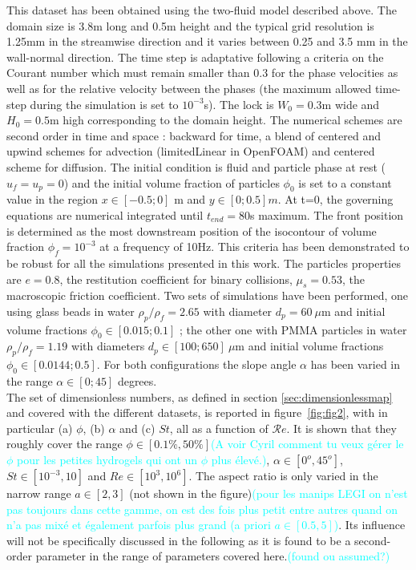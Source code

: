 \documentclass[twocolumn]{article}
\newcommand*{\marie}{\textcolor{Cyan}}
\begin{document}
This dataset has been obtained using the two-fluid model described above. The domain size is 3.8m long and 0.5m height and the typical grid resolution is 1.25mm in the streamwise direction and it varies between 0.25 and 3.5 mm in the wall-normal direction. The time step is adaptative following a criteria on the Courant number which must remain smaller than 0.3 for the phase velocities as well as for the relative velocity between the phases (the maximum allowed time-step during the simulation is set to $10^{-3}$s). The lock is $W_0=0.3$m wide and $H_0=0.5$m high corresponding to the domain height. The numerical schemes are second order in time and space : backward for time, a blend of centered and upwind schemes for advection (limitedLinear in OpenFOAM) and centered scheme for diffusion. The initial condition is fluid and particle phase at rest ($u_f=u_p=0$) and the initial volume fraction of particles $\phi_0$ is set to a constant value in the region $x\in[-0.5 ; 0]$ m and $y\in[0;0.5]m$. At t=0, the governing equations are numerical integrated until $t_{end}=80$s maximum. The front position is determined as the most downstream position of the isocontour of volume fraction $\phi_f=10^{-3}$ at a frequency of 10Hz. This criteria has been demonstrated to be robust for all the simulations presented in this work. The particles properties are $e=0.8$, the restitution coefficient for binary collisions, $\mu_s=0.53$, the macroscopic friction coefficient. Two sets of simulations have been performed, one using glass beads in water $\rho_p/\rho_f=2.65$ with diameter $d_p=60\ \mu$m and initial volume fractions $\phi_0\in[0.015 ; 0.1]$ ; the other one with PMMA particles in water $\rho_p/\rho_f=1.19$ with diameters $d_p \in [ 100 ; 650]\ \mu$m and initial volume fractions $\phi_0\in[0.0144 ; 0.5]$. For both configurations the slope angle $\alpha$ has been varied in the range $\alpha \in [0 ; 45]$ degrees.\\




The set of dimensionless numbers, as defined in section \ref{sec:dimensionlessmap} and covered with the different datasets, is reported in figure~\ref{fig:fig2}, with in particular (a) $\phi$, (b) $\alpha$ and (c) $St$, all as a function of $\mathcal{R}e$.
It is shown that they roughly cover the range $\phi\in[0.1\%,50\%]$\marie{(A voir Cyril comment tu veux gérer le $\phi$ pour les petites hydrogels qui ont un $\phi$ plus élevé.)}, $\alpha \in [0^o,45^o]$, $St\in[10^{-3}, 10]$ and $Re\in[10^3, 10^6]$. The aspect ratio is only varied in the narrow range $a\in[2,3]$ (not shown in the figure)\marie{(pour les manips LEGI on n'est pas toujours dans cette gamme, on est des fois plus petit entre autres quand on n'a pas mixé et également parfois plus grand (a priori $a\in[0.5,5]$)}. Its influence will not be specifically discussed in the following as it is found to be a second-order parameter in the range of parameters covered here.\marie{(found ou assumed?)}
\end{document}
